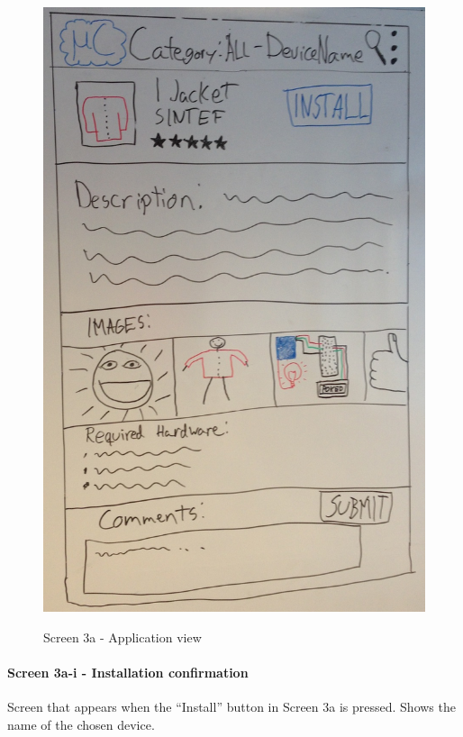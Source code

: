 \begin{figure}[H]
\centering
\includegraphics[scale=0.2]{images/Design_guide/Screen3a.png}
\label{fig:3a}
\caption{Screen 3a - Application view}
\end{figure}


\paragraph{Screen 3a-i - Installation confirmation}
Screen that appears when the ``Install'' button in Screen 3a is pressed. Shows the name of the chosen device.

